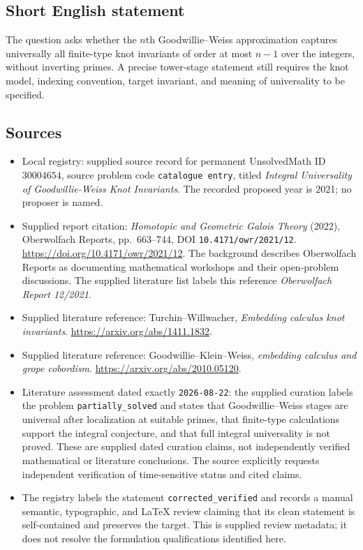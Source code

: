 \documentclass[11pt]{article}
\begin{document}
\subsection{Short English statement}
The question asks whether the \(n\)th Goodwillie--Weiss approximation captures universally all finite-type knot invariants of order at most \(n-1\) over the integers, without inverting primes. A precise tower-stage statement still requires the knot model, indexing convention, target invariant, and meaning of universality to be specified.
\subsection{Sources}
\begin{itemize}
\item Local registry: supplied source record for permanent UnsolvedMath ID \(30004654\), source problem code \texttt{catalogue entry}, titled \emph{Integral Universality of Goodwillie-Weiss Knot Invariants}. The recorded proposed year is 2021; no proposer is named.
\item Supplied report citation: \emph{Homotopic and Geometric Galois Theory} (2022), Oberwolfach Reports, pp.~663--744, DOI \texttt{10.4171/owr/2021/12}. \url{https://doi.org/10.4171/owr/2021/12}. The background describes Oberwolfach Reports as documenting mathematical workshops and their open-problem discussions. The supplied literature list labels this reference \emph{Oberwolfach Report 12/2021}.
\item Supplied literature reference: Turchin--Willwacher, \emph{Embedding calculus knot invariants}. \url{https://arxiv.org/abs/1411.1832}.
\item Supplied literature reference: Goodwillie--Klein--Weiss, \emph{embedding calculus and grope cobordism}. \url{https://arxiv.org/abs/2010.05120}.
\item Literature assessment dated exactly \texttt{2026-08-22}: the supplied curation labels the problem \texttt{partially\_solved} and states that Goodwillie--Weiss stages are universal after localization at suitable primes, that finite-type calculations support the integral conjecture, and that full integral universality is not proved. These are supplied dated curation claims, not independently verified mathematical or literature conclusions. The source explicitly requests independent verification of time-sensitive status and cited claims.
\item The registry labels the statement \texttt{corrected\_verified} and records a manual semantic, typographic, and LaTeX review claiming that its clean statement is self-contained and preserves the target. This is supplied review metadata; it does not resolve the formulation qualifications identified here.
\end{itemize}
\end{document}
